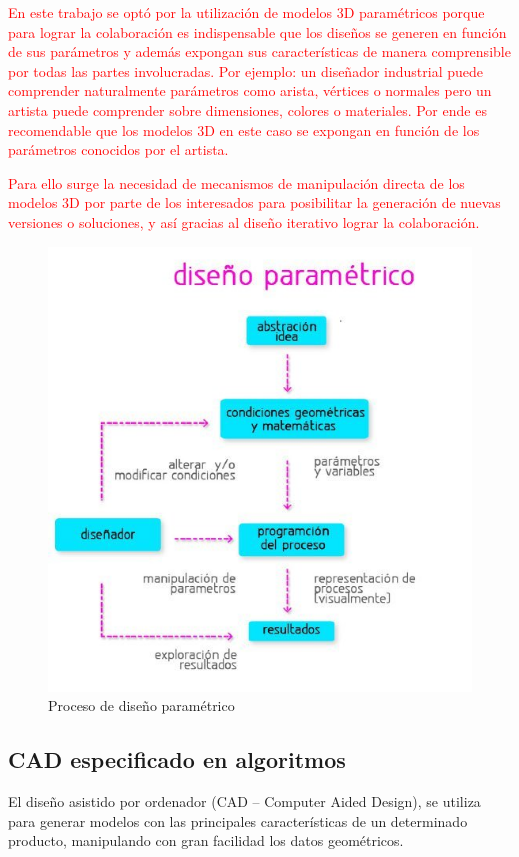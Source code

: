 \textcolor{red}{

En este trabajo se optó por la utilización de modelos 3D paramétricos porque para lograr la colaboración es indispensable que los diseños se generen en función de sus parámetros y además expongan sus características de manera comprensible por todas las partes involucradas. Por ejemplo: un diseñador industrial puede comprender naturalmente parámetros como arista, vértices o normales pero un artista puede comprender sobre dimensiones, colores o materiales. Por ende es recomendable que los modelos 3D en este caso se expongan en función de los parámetros conocidos por el artista.}
\textcolor{red}{Para ello surge la necesidad de mecanismos de manipulación directa de los modelos 3D por parte de los interesados para posibilitar la generación de nuevas versiones o soluciones, y así gracias al diseño iterativo lograr la colaboración.} 


\begin{figure}
\centering
\includegraphics[width=12cm]{Img/CPD/4-PARAM.jpg}
\caption[(optional short caption)]{\label{us_figure} Proceso de diseño paramétrico }
\end{figure}


\subsection{CAD especificado en algoritmos} 
El diseño asistido por ordenador (CAD – Computer Aided Design), se utiliza para generar modelos con las principales características de un determinado producto, manipulando con gran facilidad los datos geométricos. 

